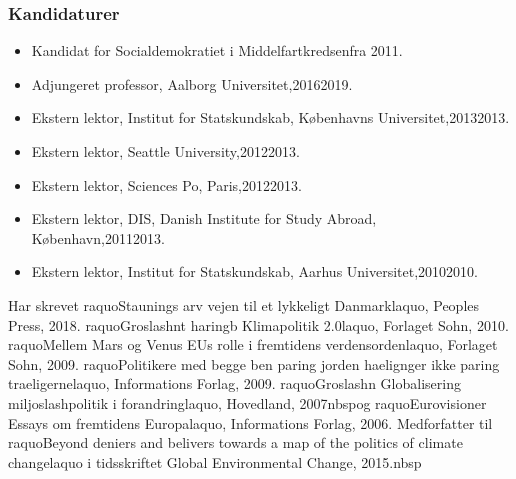 \documentclass[11pt, a4paper]{awesome-cv}
\begin{document}
\begin{cvletter}
\subsubsection*{Kandidaturer}
\begin{itemize}
\item Kandidat for Socialdemokratiet i Middelfartkredsenfra 2011.
\end{itemize}
\begin{itemize}
\item Adjungeret professor, Aalborg Universitet,20162019.
\item Ekstern lektor, Institut for Statskundskab, Københavns Universitet,20132013.
\item Ekstern lektor, Seattle University,20122013.
\item Ekstern lektor, Sciences Po, Paris,20122013.
\item Ekstern lektor, DIS, Danish Institute for Study Abroad, København,20112013.
\item Ekstern lektor, Institut for Statskundskab, Aarhus Universitet,20102010.
\end{itemize}
Har skrevet raquoStaunings arv  vejen til et lykkeligt Danmarklaquo, Peoples Press, 2018. raquoGroslashnt haringb  Klimapolitik 2.0laquo, Forlaget Sohn, 2010. raquoMellem Mars og Venus  EUs rolle i fremtidens verdensordenlaquo, Forlaget Sohn, 2009. raquoPolitikere med begge ben paring jorden haelignger ikke paring traeligernelaquo, Informations Forlag, 2009. raquoGroslashn Globalisering  miljoslashpolitik i forandringlaquo, Hovedland, 2007nbspog raquoEurovisioner  Essays om fremtidens Europalaquo, Informations Forlag, 2006. Medforfatter til raquoBeyond deniers and belivers  towards a map of the politics of climate changelaquo i tidsskriftet Global Environmental Change, 2015.nbsp

\end{cvletter}
\end{document}
